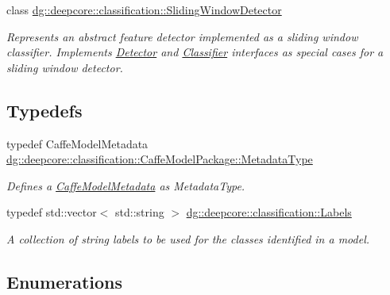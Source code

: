 \begin{DoxyCompactItemize}
class \hyperlink{classdg_1_1deepcore_1_1classification_1_1_sliding_window_detector}{dg\+::deepcore\+::classification\+::\+Sliding\+Window\+Detector}
\begin{DoxyCompactList}\small\item\em Represents an abstract feature detector implemented as a sliding window classifier. Implements \hyperlink{classdg_1_1deepcore_1_1classification_1_1_detector}{Detector} and \hyperlink{classdg_1_1deepcore_1_1classification_1_1_classifier}{Classifier} interfaces as special cases for a sliding window detector. \end{DoxyCompactList}\end{DoxyCompactItemize}
\subsection*{Typedefs}
\begin{DoxyCompactItemize}
\item 
typedef Caffe\+Model\+Metadata \hyperlink{group___classification_module_gae0f23f2d134e0b3fc83b807077e32e8b}{dg\+::deepcore\+::classification\+::\+Caffe\+Model\+Package\+::\+Metadata\+Type}
\begin{DoxyCompactList}\small\item\em Defines a \hyperlink{structdg_1_1deepcore_1_1classification_1_1_caffe_model_metadata}{Caffe\+Model\+Metadata} as Metadata\+Type. \end{DoxyCompactList}\item 
typedef std\+::vector$<$ std\+::string $>$ \hyperlink{group___classification_module_ga4c4d47162fed299b627f2e9d17381866}{dg\+::deepcore\+::classification\+::\+Labels}
\begin{DoxyCompactList}\small\item\em A collection of string labels to be used for the classes identified in a model. \end{DoxyCompactList}\end{DoxyCompactItemize}
\subsection*{Enumerations}
